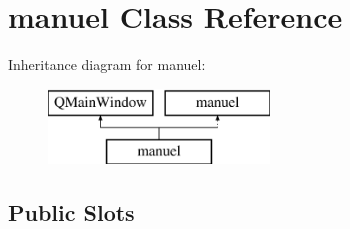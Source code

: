\hypertarget{classmanuel}{}\section{manuel Class Reference}
\label{classmanuel}
Inheritance diagram for manuel\+:\begin{figure}[H]
\begin{center}
\leavevmode
\includegraphics[height=2.000000cm]{classmanuel}
\end{center}
\end{figure}
\subsection*{Public Slots}
